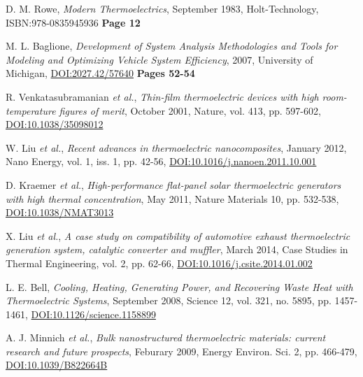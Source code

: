 \documentclass[12pt]{article}
\begin{document}
\pagebreak

\begin{thebibliography}{11}

D. M. Rowe,
\emph{Modern Thermoelectrics},
September 1983,
Holt-Technology,
ISBN:978-0835945936
\textbf{Page 12}

M. L. Baglione,
\emph{Development of System Analysis Methodologies and Tools for Modeling and Optimizing Vehicle System Efficiency},
2007,
University of Michigan,
\href{http://dx.doi.org/2027.42/57640}{DOI:2027.42/57640}
\textbf{Pages 52-54}

R. Venkatasubramanian \emph{et al.},
\emph{Thin-film thermoelectric devices with high room-temperature figures of merit},
October 2001,
Nature, vol. 413, pp. 597-602,
\href{http://dx.doi.org/10.1038/35098012}{DOI:10.1038/35098012}

W. Liu \emph{et al.},
\emph{Recent advances in thermoelectric nanocomposites},
January 2012,
Nano Energy, vol. 1, iss. 1, pp. 42-56,
\href{http://dx.doi.org/10.1016/j.nanoen.2011.10.001}{DOI:10.1016/j.nanoen.2011.10.001}

D. Kraemer \emph{et al.},
\emph{High-performance flat-panel solar thermoelectric
generators with high thermal concentration},
May 2011,
Nature Materials 10, pp. 532-538,
\href{http://dx.doi.org/10.1038/NMAT3013}{DOI:10.1038/NMAT3013}

X. Liu \emph{et al.},
\emph{A case study on compatibility of automotive exhaust thermoelectric generation system, catalytic converter and muffler},
March 2014,
Case Studies in Thermal Engineering, vol. 2, pp. 62-66,
\href{http://dx.doi.org/10.1016/j.csite.2014.01.002}{DOI:10.1016/j.csite.2014.01.002}

L. E. Bell,
\emph{Cooling, Heating, Generating Power, and Recovering Waste Heat with Thermoelectric Systems},
September 2008,
Science 12, vol. 321, no. 5895, pp. 1457-1461,
\href{http://dx.doi.org/10.1126/science.1158899}{DOI:10.1126/science.1158899}

A. J. Minnich \emph{et al.},
\emph{Bulk nanostructured thermoelectric materials: current research and future prospects},
Feburary 2009,
Energy Environ. Sci. 2, pp. 466-479,
\href{http://dx.doi.org/10.1039/B822664B}{DOI:10.1039/B822664B}


\end{thebibliography}
\end{document}
